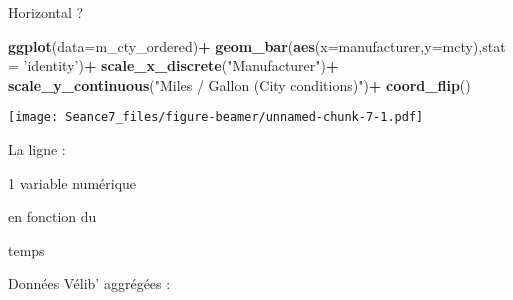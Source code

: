 \documentclass[ignorenonframetext,]{beamer}
\newenvironment{Shaded}{\begin{snugshade}}{\end{snugshade}}
\newcommand{\CommentTok}[1]{\textcolor[rgb]{0.56,0.35,0.01}{\textit{#1}}}
\newcommand{\ControlFlowTok}[1]{\textcolor[rgb]{0.13,0.29,0.53}{\textbf{#1}}}
\newcommand{\DataTypeTok}[1]{\textcolor[rgb]{0.13,0.29,0.53}{#1}}
\newcommand{\KeywordTok}[1]{\textcolor[rgb]{0.13,0.29,0.53}{\textbf{#1}}}
\newcommand{\NormalTok}[1]{#1}
\newcommand{\OperatorTok}[1]{\textcolor[rgb]{0.81,0.36,0.00}{\textbf{#1}}}
\newcommand{\StringTok}[1]{\textcolor[rgb]{0.31,0.60,0.02}{#1}}
\begin{document}
\begin{frame}[fragile]{{ Horizontal ?}}
\protect\hypertarget{horizontal}{}

\begin{Shaded}
\begin{Highlighting}[]
\KeywordTok{ggplot}\NormalTok{(}\DataTypeTok{data=}\NormalTok{m_cty_ordered)}\OperatorTok{+}
\StringTok{  }\KeywordTok{geom_bar}\NormalTok{(}\KeywordTok{aes}\NormalTok{(}\DataTypeTok{x=}\NormalTok{manufacturer,}\DataTypeTok{y=}\NormalTok{mcty),}\DataTypeTok{stat =} \StringTok{'identity'}\NormalTok{)}\OperatorTok{+}
\StringTok{  }\KeywordTok{scale_x_discrete}\NormalTok{(}\StringTok{"Manufacturer"}\NormalTok{)}\OperatorTok{+}
\StringTok{  }\KeywordTok{scale_y_continuous}\NormalTok{(}\StringTok{"Miles / Gallon (City conditions)"}\NormalTok{)}\OperatorTok{+}
\StringTok{  }\KeywordTok{coord_flip}\NormalTok{()}
\end{Highlighting}
\end{Shaded}

\texttt{[image: Seance7\_files/figure-beamer/unnamed-chunk-7-1.pdf]}

\end{frame}

\begin{frame}{}
\protect\hypertarget{section-8}{}

La ligne :

{ 1 variable numérique}

en fonction du

{ temps}

\end{frame}

\begin{frame}[fragile]{}
\protect\hypertarget{section-9}{}

Données Vélib' aggrégées :

\begin{Shaded}
\end{Shaded}

\end{frame}
\end{document}
